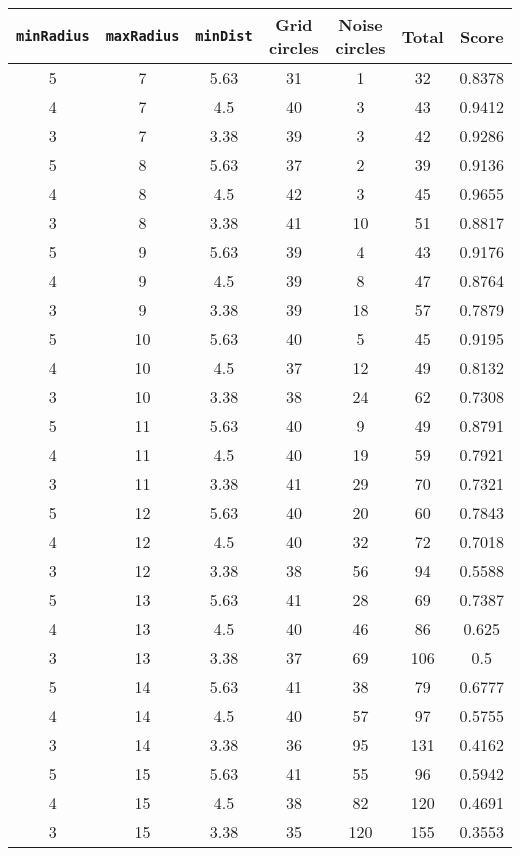 \documentclass[letterpaper, 12pt]{article}
\begin{document}
\begin{longtable}{|c|c|c|c|c|c|c|}
\hline
\textbf{\texttt{minRadius}} & \textbf{\texttt{maxRadius}} & \textbf{\texttt{minDist}} & \textbf{Grid circles} & \textbf{Noise circles} & \textbf{Total} & \textbf{Score} \\
\hline
5 & 7 & 5.63 & 31 & 1 & 32 & 0.8378 \\
\hline
4 & 7 & 4.5 & 40 & 3 & 43 & 0.9412 \\
\hline
3 & 7 & 3.38 & 39 & 3 & 42 & 0.9286 \\
\hline
5 & 8 & 5.63 & 37 & 2 & 39 & 0.9136 \\
\hline
4 & 8 & 4.5 & 42 & 3 & 45 & 0.9655 \\
\hline
3 & 8 & 3.38 & 41 & 10 & 51 & 0.8817 \\
\hline
5 & 9 & 5.63 & 39 & 4 & 43 & 0.9176 \\
\hline
4 & 9 & 4.5 & 39 & 8 & 47 & 0.8764 \\
\hline
3 & 9 & 3.38 & 39 & 18 & 57 & 0.7879 \\
\hline
5 & 10 & 5.63 & 40 & 5 & 45 & 0.9195 \\
\hline
4 & 10 & 4.5 & 37 & 12 & 49 & 0.8132 \\
\hline
3 & 10 & 3.38 & 38 & 24 & 62 & 0.7308 \\
\hline
5 & 11 & 5.63 & 40 & 9 & 49 & 0.8791 \\
\hline
4 & 11 & 4.5 & 40 & 19 & 59 & 0.7921 \\
\hline
3 & 11 & 3.38 & 41 & 29 & 70 & 0.7321 \\
\hline
5 & 12 & 5.63 & 40 & 20 & 60 & 0.7843 \\
\hline
4 & 12 & 4.5 & 40 & 32 & 72 & 0.7018 \\
\hline
3 & 12 & 3.38 & 38 & 56 & 94 & 0.5588 \\
\hline
5 & 13 & 5.63 & 41 & 28 & 69 & 0.7387 \\
\hline
4 & 13 & 4.5 & 40 & 46 & 86 & 0.625 \\
\hline
3 & 13 & 3.38 & 37 & 69 & 106 & 0.5 \\
\hline
5 & 14 & 5.63 & 41 & 38 & 79 & 0.6777 \\
\hline
4 & 14 & 4.5 & 40 & 57 & 97 & 0.5755 \\
\hline
3 & 14 & 3.38 & 36 & 95 & 131 & 0.4162 \\
\hline
5 & 15 & 5.63 & 41 & 55 & 96 & 0.5942 \\
\hline
4 & 15 & 4.5 & 38 & 82 & 120 & 0.4691 \\
\hline
3 & 15 & 3.38 & 35 & 120 & 155 & 0.3553 \\

\end{longtable}
\end{document}
